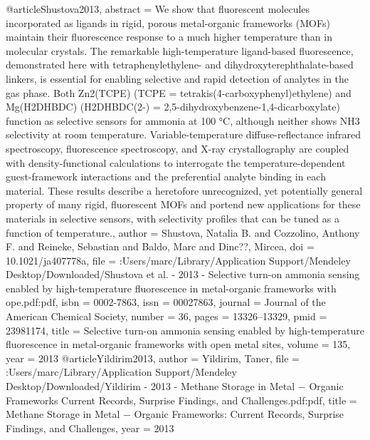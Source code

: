 @article{Shustova2013,
abstract = {We show that fluorescent molecules incorporated as ligands in rigid, porous metal-organic frameworks (MOFs) maintain their fluorescence response to a much higher temperature than in molecular crystals. The remarkable high-temperature ligand-based fluorescence, demonstrated here with tetraphenylethylene- and dihydroxyterephthalate-based linkers, is essential for enabling selective and rapid detection of analytes in the gas phase. Both Zn2(TCPE) (TCPE = tetrakis(4-carboxyphenyl)ethylene) and Mg(H2DHBDC) (H2DHBDC(2-) = 2,5-dihydroxybenzene-1,4-dicarboxylate) function as selective sensors for ammonia at 100 °C, although neither shows NH3 selectivity at room temperature. Variable-temperature diffuse-reflectance infrared spectroscopy, fluorescence spectroscopy, and X-ray crystallography are coupled with density-functional calculations to interrogate the temperature-dependent guest-framework interactions and the preferential analyte binding in each material. These results describe a heretofore unrecognized, yet potentially general property of many rigid, fluorescent MOFs and portend new applications for these materials in selective sensors, with selectivity profiles that can be tuned as a function of temperature.},
author = {Shustova, Natalia B. and Cozzolino, Anthony F. and Reineke, Sebastian and Baldo, Marc and Dinc??, Mircea},
doi = {10.1021/ja407778a},
file = {:Users/marc/Library/Application Support/Mendeley Desktop/Downloaded/Shustova et al. - 2013 - Selective turn-on ammonia sensing enabled by high-temperature fluorescence in metal-organic frameworks with ope.pdf:pdf},
isbn = {0002-7863},
issn = {00027863},
journal = {Journal of the American Chemical Society},
number = {36},
pages = {13326--13329},
pmid = {23981174},
title = {{Selective turn-on ammonia sensing enabled by high-temperature fluorescence in metal-organic frameworks with open metal sites}},
volume = {135},
year = {2013}
}
@article{Yildirim2013,
author = {Yildirim, Taner},
file = {:Users/marc/Library/Application Support/Mendeley Desktop/Downloaded/Yildirim - 2013 - Methane Storage in Metal − Organic Frameworks Current Records, Surprise Findings, and Challenges.pdf:pdf},
title = {{Methane Storage in Metal − Organic Frameworks: Current Records, Surprise Findings, and Challenges}},
year = {2013}
}
